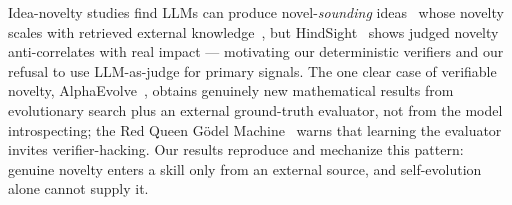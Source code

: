  Idea-novelty studies find LLMs can
produce novel-\emph{sounding} ideas~\citep{novelideas} whose novelty scales with retrieved
external knowledge~\citep{nova}, but HindSight~\citep{hindsight} shows judged novelty
anti-correlates with real impact --- motivating our deterministic verifiers and our refusal to
use LLM-as-judge for primary signals. The one clear case of verifiable novelty,
AlphaEvolve~\citep{alphaevolve}, obtains genuinely new mathematical results from evolutionary
search plus an external ground-truth evaluator, not from the model introspecting; the Red Queen
G\"odel Machine~\citep{redqueen} warns that learning the evaluator invites verifier-hacking.
Our results reproduce and mechanize this pattern: genuine novelty enters a skill only from an
external source, and self-evolution alone cannot supply it.
